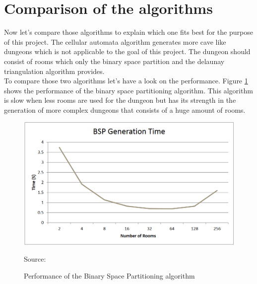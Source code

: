 \documentclass[a4paper,11pt,oneside]{scrreprt}
\begin{document}
\section{Comparison of the algorithms}
\label{section:comparison-of-the-algorithms}
Now let's compare those algorithms to explain which one fits best for the purpose of this project. The cellular automata algorithm generates more cave like dungeons which is not applicable to the goal of this project. The dungeon should consist of rooms which only the binary space partition and the delaunay triangulation algorithm provides. 
\\
To compare those two algorithms let's have a look on the performance. Figure \ref{fig:bsp_performance} shows the performance of the binary space partitioning algorithm. This algorithm is slow when less rooms are used for the dungeon but has its strength in the generation of more complex dungeons that consists of a huge amount of rooms.  
\begin{figure}[ht]
	\centering
	\includegraphics[scale=0.6]{images/bsp_performance.png} 
	\caption{Performance of the Binary Space Partitioning algorithm}
	Source: \cite[][]{williams_investigation_nodate}
	\label{fig:bsp_performance}
\end{figure}
\end{document}
